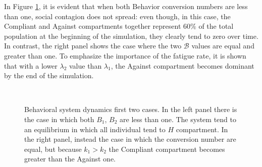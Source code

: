 In Figure \ref{fig:model__behavior_sim_1}, it is evident that when both Behavior conversion numbers are less than one, social contagion does not spread: even though, in this case, the Compliant and Against compartments together represent $60\%$ of the total population at the beginning of the simulation, they clearly tend to zero over time. In contrast, the right panel shows the case where the two $\mathcal{B}$ values are equal and greater than one. To emphasize the importance of the fatigue rate, it is shown that with a lower $\lambda_2$ value than $\lambda_1$, the Against compartment becomes dominant by the end of the simulation. 
\begin{figure}[ht]
	\centering
	 \quad
	 \\
	\caption[Behavioural model simulation first]{Behavioral system dynamics first two cases. In the left panel there is the case in which both $B_1$, $B_2$ are less than one. The system tend to an equilibrium in which all individual tend to $H$ compartment. In the right panel, instead the case in which the conversion number are equal, but because $k_1 > k_2$ the Compliant compartment becomes greater than the Against one.}
	\label{fig:model__behavior_sim_1}
\end{figure}
\label{subsec:model_behav}

